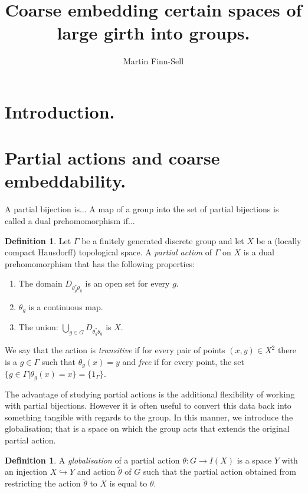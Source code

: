 \documentclass[11pt,a4paper]{amsart}
\title{Coarse embedding certain spaces of large girth into groups.}
\author{Martin Finn-Sell}
\theoremstyle{plain}
\theoremstyle{definition}%
\newtheorem{definition}[theorem]{Definition}%
\theoremstyle{remark}%
\begin{document}
\maketitle

\section{Introduction.}

\section{Partial actions and coarse embeddability.}

A partial bijection is...
A map of a group into the set of partial bijections is called a dual prehomomorphism if...

\begin{definition}
Let $\Gamma$ be a finitely generated discrete group and let $X$ be a (locally compact Hausdorff) topological space. A \textit{partial action} of $\Gamma$ on $X$ is a dual prehomomorphism that has the following properties:
\begin{enumerate}
\item The domain $D_{\theta_{g}^{*}\theta_{g}}$ is an open set for every $g$.
\item $\theta_{g}$ is a continuous map.
\item The union: $\bigcup_{g \in G}D_{\theta_{g}^{*}\theta_{g}}$ is $X$.
\end{enumerate}
We say that the action is \textit{transitive} if for every pair of points $(x,y) \in X^{2}$ there is a $g\in \Gamma$ such that $\theta_{g}(x)=y$ and \textit{free} if for every point, the set $\lbrace g \in \Gamma | \theta_{g}(x)=x \rbrace=\lbrace 1_{\Gamma} \rbrace$.
\end{definition}

The advantage of studying partial actions is the additional flexibility of working with partial bijections. However it is often useful to convert this data back into something tangible with regards to the group. In this manner, we introduce the globalisation; that is a space on which the group acts that extends the original partial action.

\begin{definition}
A \textit{globalisation} of a partial action $\theta: G \rightarrow I(X)$ is a space $Y$ with an injection $X \hookrightarrow Y$ and action $\tilde{\theta}$ of $G$ such that the partial action obtained from restricting the action $\tilde{\theta}$ to $X$ is equal to $\theta$. 
\end{definition}
\end{document}
